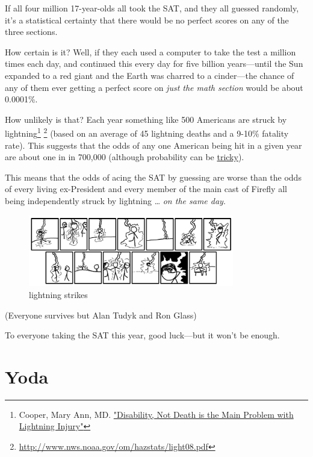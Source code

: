{If all four million 17-year-olds all took the SAT, and they all guessed randomly, it’s a statistical certainty that there would be no perfect scores on any of the three sections.}

{How certain is it? Well, if they each used a computer to take the test a million times each day, and continued this every day for five billion years—until the Sun expanded to a red giant and the Earth was charred to a cinder—the chance of any of them ever getting a perfect score on \emph{just the math section} would be about 0.0001\%.}

{How unlikely is that? Each year something like 500 Americans are struck by lightning{\footnote{Cooper, Mary Ann, MD. \href{http://www.uic.edu/labs/lightninginjury/Disability.pdf}{"Disability, Not Death is the Main Problem with Lightning Injury"}} } {\footnote{ \href{http://www.nws.noaa.gov/om/hazstats/light08.pdf}{http://www.nws.noaa.gov/om/hazstats/light08.pdf}} } (based on an average of 45 lightning deaths and a 9-10\% fatality rate). This suggests that the odds of any one American being hit in a given year are about one in in 700,000 (although probability can be \href{http://xkcd.com/795/}{tricky}).}

{This means that the odds of acing the SAT by guessing are worse than the odds of every living ex-President and every member of the main cast of Firefly all being independently struck by lightning … \emph{on the same day}.}

\begin{figure}[!htbp]
\centering
\includegraphics[scale=0.5, max width=0.8\textwidth]{imgs/a/2/03.png}
\caption{lightning strikes}
\end{figure}

{(Everyone survives but Alan Tudyk and Ron Glass)}

{To everyone taking the SAT this year, good luck—but it won’t be enough.}

{
\chapter{Yoda}
}

